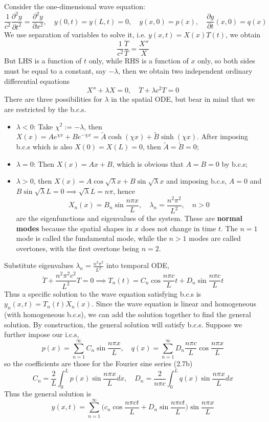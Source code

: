 \documentclass[a4paper]{article}
\begin{document}
\begin{eg}
Consider the one-dimensional wave equation:
$$    \frac{1}{c^2}\frac{\partial^2y}{\partial t^2}=\frac{\partial^2y}{\partial x^2},\quad y(0,t)=y(L,t)=0,\quad y(x,0)=p(x),\quad\frac{\partial y}{\partial t}(x,0)=q(x)$$
We use separation of variables to solve it, i.e. $y(x,t)=X(x)T(t)$, we obtain
$$\frac{1}{c^2}\frac{\ddot{T}}{T}=\frac{X''}{X}$$
But LHS is a function of $t$ only, while RHS is a function of $x$ only, so both sides must be equal to a constant, say $-\lambda$, then we obtain two independent ordinary differential equations
$$    X''+\lambda X=0,\quad \ddot{T}+\lambda c^2 T=0$$
There are three possibilities for $\lambda$ in the spatial ODE, but bear in mind that we are restricted by the b.c.s.
\begin{itemize}
    \item $\lambda<0$: Take $\chi^2:=-\lambda$, then $X(x)=Ae^{\chi x}+Be^{-\chi x}=\tilde{A}\cosh(\chi x)+\tilde{B}\sinh(\chi x)$. After imposing b.c.s which is also $X(0)=X(L)=0$, then $\tilde{A}=\tilde{B}=0$;
    \item $\lambda=0$: Then $X(x)=Ax+B$, which is obvious that $A=B=0$ by b.c.s;
    \item $\lambda>0$, then $X(x)=A\cos\sqrt{\lambda}x+B\sin\sqrt{\lambda}x$ and imposing b.c.s, $A=0$ and $B\sin\sqrt{\lambda}L=0\implies\sqrt{\lambda}L=n\pi$, hence
$$  X_n(x)=B_n\sin\frac{n\pi x}{L},\quad\lambda_n=\frac{n^2\pi^2}{L^2},\quad n>0$$
    are the eigenfunctions and eigenvalues of the system. These are \textbf{normal modes} because the spatial shapes in $x$ does not change in time $t$. The $n=1$ mode is called the fundamental mode, while the $n>1$ modes are called overtones, with the first overtone being $n=2$.
\end{itemize}
Substitute eigenvalues $\lambda_n=\frac{n^2\pi^2}{L^2}$ into temporal ODE,
$$\ddot{T}+\frac{n^2\pi^2c^2}{L^2}T=0\implies T_n(t)=C_n\cos\frac{n\pi c}{L}t+D_n\sin\frac{n\pi c}{L}t$$
Thus a specific solution to the wave equation satisfying b.c.s is $y_n(x,t)=T_n(t)X_n(x)$. Since the wave equation is linear and homogeneous (with homogeneous b.c.s), we can add the solution together to find the general solution. By construction, the general solution will satisfy b.c.s. Suppose we further impose our i.c.s,
$$p(x)=\sum_{n=1}^\infty C_n\sin\frac{n\pi x}{L},\quad q(x)=\sum_{n=1}^\infty D_n\frac{n\pi c}{L}\cos\frac{n\pi x}{L}$$
so the coefficients are those for the Fourier sine series (2.7b) 
$$C_n=\frac{2}{L}\int_0^Lp(x)\sin\frac{n\pi x}{L}dx,\quad D_n=\frac{2}{n\pi c}\int_0^Lq(x)\sin\frac{n\pi x}{L}dx$$
Thus the general solution is
$$y(x,t)=\sum_{n=1}^\infty\bigg(c_n\cos\frac{n\pi ct}{L}+D_n\sin\frac{n\pi ct}{L}\bigg)\sin\frac{n\pi x}{L}$$
\end{eg}
\newpage
\end{document}
